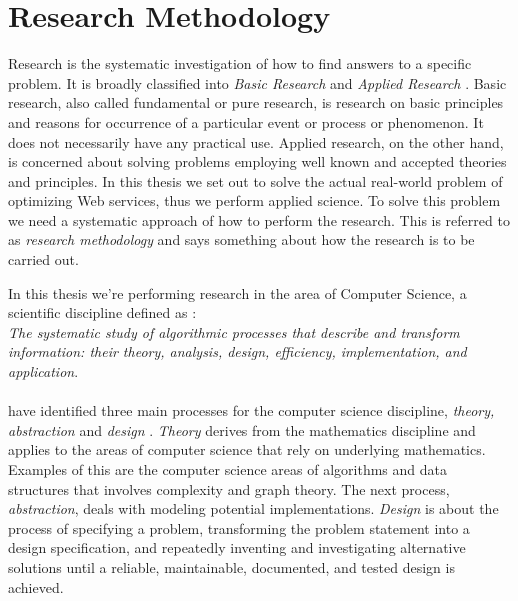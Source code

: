 \section{Research Methodology}

Research is the systematic investigation of how to find answers to a specific
problem. It is broadly classified into \textit{Basic Research} and
\textit{Applied Research} \cite{rajasekar2006research}. Basic research, also
called fundamental or pure research, is research on basic principles and reasons
for occurrence of a particular event or process or phenomenon. It does not
necessarily have any practical use. Applied research, on the other hand, is
concerned about solving problems employing well known and accepted theories and
principles. In this thesis we set out to solve the actual real-world problem of
optimizing Web services, thus we perform applied science. To solve this problem
we need a systematic approach of how to perform the research. This is referred
to as \textit{research methodology} and says something about how the research is
to be carried out.

In this thesis we're performing research in the area of Computer Science, a
scientific discipline defined as \cite{denning}: \\

\textit{The systematic study of algorithmic processes that
describe and transform information: their theory, analysis, design, efficiency,
implementation, and application}.

\paragraph{}

 \citeauthor{denning} have identified three main processes for the computer science
 discipline, \textit{theory, abstraction} and \textit{design} \cite{denning}.
 \textit{Theory} derives from the mathematics discipline and applies to the areas of
 computer science that rely on underlying mathematics. Examples of this are
 the computer science areas of algorithms and data structures that involves
 complexity and graph theory. The next process, \textit{abstraction}, deals with
 modeling potential implementations. \textit{Design} is about the process of
 specifying a problem, transforming the problem statement into a design
 specification, and repeatedly inventing and investigating alternative solutions
 until a reliable, maintainable, documented, and tested design is achieved.

